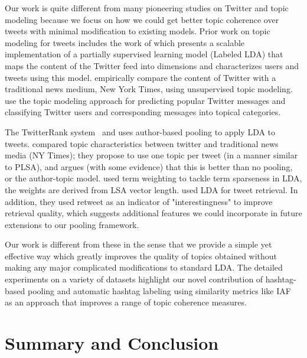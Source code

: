 \documentclass[10pt,a5paper,twoside]{article}
\begin{document}
Our work is quite different from many pioneering studies on Twitter
and topic modeling because we focus on how we could get better
topic coherence over tweets with minimal modification to existing
models. Prior work on topic modeling for tweets includes the work of
\cite{ramage} which presents a scalable implementation of a partially
supervised learning model (Labeled LDA) that maps the content of the
Twitter feed into dimensions and characterizes users and tweets using
this model. \cite{wayne} empirically compare the content of Twitter
with a traditional news medium, New York Times, using unsupervised
topic modeling. \cite{hong} use the topic modeling approach for
predicting popular Twitter messages and classifying Twitter users and
corresponding messages into topical categories.

The {T}witterRank system~\cite{Weng2010wsdm} and \cite{hong} uses
author-based pooling to apply LDA to tweets. \cite{wayne} compared
topic characteristics between twitter and traditional news media (NY
Times); they propose to use one topic per tweet (in a manner similar to
PLSA), and argues (with some evidence) that this is better than no
pooling, or the author-topic model. \cite{kireyev2009} used term weighting
to tackle term sparseness in LDA, the weights are derived from LSA
vector length. \cite{Naveed2011cikm} used LDA for tweet retrieval. In
addition, they used retweet as an indicator of "interestingness" to
improve retrieval quality, which suggests additional features we
could incorporate in future extensions to our pooling framework.

Our work is different from these in the sense that we provide a simple
yet effective way which greatly improves the quality of topics
obtained without making any major complicated modifications to
standard LDA. The detailed experiments on a variety of datasets
highlight our novel contribution of hashtag-based pooling and automatic
hashtag labeling using similarity metrics like IAF~\cite{iaf} as an
approach that improves a range of topic coherence measures.


\section{Summary and Conclusion}
\end{document}
